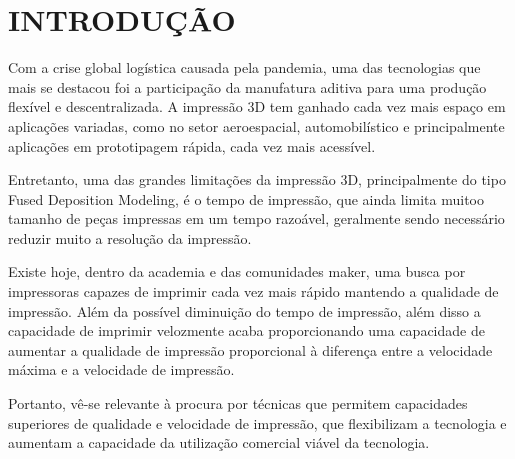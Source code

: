 \chapter{INTRODUÇÃO}
Com a crise global logística causada pela pandemia, uma das tecnologias
que mais se destacou foi a participação da manufatura aditiva para uma
produção flexível e descentralizada. A impressão 3D tem ganhado cada vez
mais espaço em aplicações variadas, como no setor aeroespacial,
automobilístico e principalmente aplicações em prototipagem rápida,
cada vez mais acessível.

Entretanto, uma das grandes limitações da impressão 3D, principalmente
do tipo Fused Deposition Modeling, é o tempo de impressão, que ainda 
limita muitoo tamanho de peças impressas em um tempo razoável, 
geralmente sendo necessário reduzir muito a resolução da impressão.

Existe hoje, dentro da academia e das comunidades maker, uma busca por 
impressoras capazes de imprimir cada vez mais rápido mantendo a qualidade 
de impressão. Além  da possível diminuição do tempo de impressão, 
além disso a capacidade de imprimir velozmente acaba proporcionando 
uma capacidade de aumentar a qualidade de impressão proporcional à diferença
entre a velocidade máxima e a velocidade de impressão.

Portanto, vê-se  relevante à procura por técnicas que permitem capacidades 
superiores de qualidade e velocidade de impressão, que flexibilizam a 
tecnologia e aumentam a capacidade da utilização comercial viável da tecnologia.
